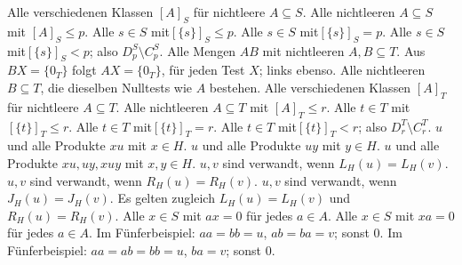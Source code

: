 %
  {Alle verschiedenen Klassen \([A]_S\) für nichtleere \(A\subseteq S\).}
%
  {Alle nichtleeren \(A\subseteq S\) mit \([A]_S\le p\).}
%
  {Alle \(s\in S\) mit\newline \([\{s\}]_S\le p\).}
%
  {Alle \(s\in S\) mit\newline \([\{s\}]_S=p\).}
%
  {Alle \(s\in S\) mit\newline \([\{s\}]_S<p\); also \(D_p^S\setminus C_p^S\).}
%
  {Alle Mengen \(AB\) mit nichtleeren \(A,B\subseteq T\).}
%
  {Aus \(BX=\{0_T\}\) folgt \(AX=\{0_T\}\), für jeden Test \(X\); links ebenso.}
%
  {Alle nichtleeren \(B\subseteq T\), die dieselben Nulltests wie \(A\) bestehen.}
%
  {Alle verschiedenen Klassen \([A]_T\) für nichtleere \(A\subseteq T\).}
%
  {Alle nichtleeren \(A\subseteq T\) mit \([A]_T\le r\).}
%
  {Alle \(t\in T\) mit\newline \([\{t\}]_T\le r\).}
%
  {Alle \(t\in T\) mit\newline \([\{t\}]_T=r\).}
%
  {Alle \(t\in T\) mit\newline \([\{t\}]_T<r\); also \(D_r^T\setminus C_r^T\).}
%
  {\(u\) und alle Produkte \(xu\) mit \(x\in H\).}
%
  {\(u\) und alle Produkte \(uy\) mit \(y\in H\).}
%
  {\(u\) und alle Produkte \(xu,uy,xuy\) mit \(x,y\in H\).}
%
  {\(u,v\) sind verwandt, wenn \(L_H(u)=L_H(v)\).}
%
  {\(u,v\) sind verwandt, wenn \(R_H(u)=R_H(v)\).}
%
  {\(u,v\) sind verwandt, wenn \(J_H(u)=J_H(v)\).}
%
  {Es gelten zugleich \(L_H(u)=L_H(v)\) und \(R_H(u)=R_H(v)\).}
%
  {Alle \(x\in S\) mit \(ax=0\) für jedes \(a\in A\).}
%
  {Alle \(x\in S\) mit \(xa=0\) für jedes \(a\in A\).}
%
  {Im Fünferbeispiel: \(aa=bb=u\), \(ab=ba=v\); sonst \(0\).}
%
  {Im Fünferbeispiel: \(aa=ab=bb=u\), \(ba=v\); sonst \(0\).}

